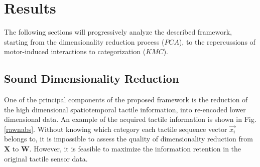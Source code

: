\documentclass[]{interact}
\theoremstyle{plain}%
\theoremstyle{definition}
\theoremstyle{remark}
\begin{document}
\section{Results} \label{sec_results}
The following sections will progressively analyze the described framework, starting from the dimensionality reduction
process ($PCA$), to the repercussions of motor-induced interactions to categorization ($KMC$).

\subsection{Sound Dimensionality Reduction}

One of the principal components of the proposed framework is the reduction of the high dimensional 
spatiotemporal tactile information, into re-encoded lower dimensional data. An example of the 
acquired tactile information is shown in Fig. \ref{rawnabs}.
Without knowing which category each tactile sequence vector $\vec{x_i}$ belongs to, it is impossible to assess
the quality of dimensionality reduction from $\mathbf{X}$ to $\mathbf{W}$. However, it is feasible to maximize the
information retention in the original tactile sensor data.
\end{document}
